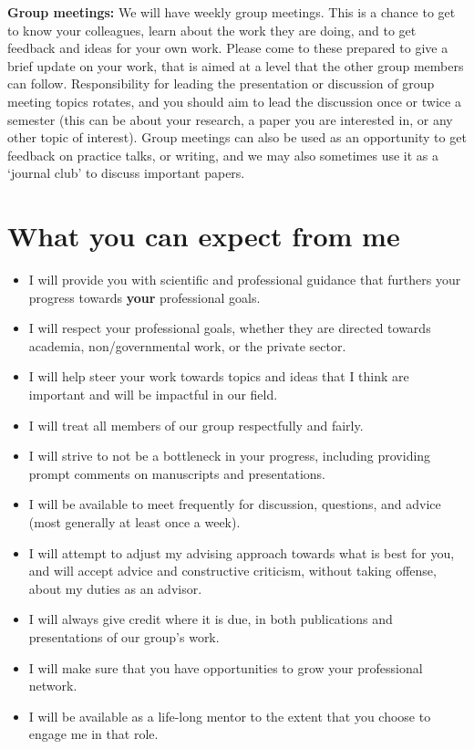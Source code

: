 \documentclass{classassignments}
\begin{document}
\textbf{Group meetings:} We will have weekly group meetings. This is a chance to get to know your colleagues, learn about the work they are doing, and to get feedback and ideas for your own work. Please come to these prepared to give a brief update on your work, that is aimed at a level that the other group members can follow. Responsibility for leading the presentation or discussion of group meeting topics rotates, and you should aim to lead the discussion once or twice a semester (this can be about your research, a paper you are interested in, or any other topic of interest). Group meetings can also be used as an opportunity to get feedback on practice talks, or writing, and we may also sometimes use it as a `journal club' to discuss important papers. 

\section{What you can expect from me}
\begin{itemize}
	\item I will provide you with scientific and professional 	guidance that furthers your progress towards \textbf{your} professional goals.
	\item I will respect your professional goals, whether they are directed towards academia, non/governmental work, or the private sector.
	\item I will help steer your work towards topics and ideas that I think are important and will be impactful in our field.
	\item I will treat all members of our group respectfully and fairly.
	\item I will strive to not be a bottleneck in your progress, including providing prompt comments on manuscripts and presentations.
	\item I will be available to meet frequently for discussion, questions, and advice (most generally at least once a week).
	\item I will  attempt to adjust my advising approach towards what is best for you, and will accept advice and constructive criticism, without taking offense, about my duties as an advisor.
	\item I will always give credit where it is due, in both publications and presentations of our group's work.
	\item I will make sure that you have opportunities to grow your professional network.
	\item I will be available as a life-long mentor to the extent that you choose to engage me in that role.
\end{itemize}
\end{document}
